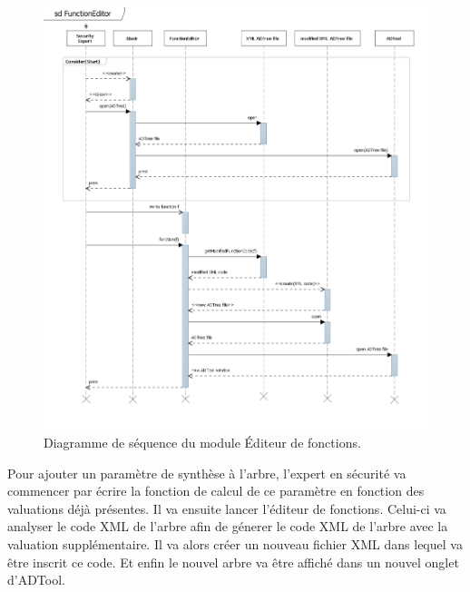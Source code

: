 	    \begin{figure}[H]
	        \centering
	        \includegraphics[height=1\textwidth]{figure/FunctionEditor.png}
	        \caption{Diagramme de séquence du module Éditeur de fonctions.}
	        \label{fig:function}
	    \end{figure}

Pour ajouter un paramètre de synthèse à l'arbre, l'expert en sécurité va commencer par écrire la fonction de calcul de ce paramètre en fonction des valuations déjà présentes. Il va ensuite lancer l'éditeur de fonctions. Celui-ci va analyser le code XML de l'arbre afin de génerer le code XML de l'arbre avec la valuation supplémentaire. Il va alors créer un nouveau fichier XML dans lequel va être inscrit ce code. Et enfin le nouvel arbre va être affiché dans un nouvel onglet d'ADTool.